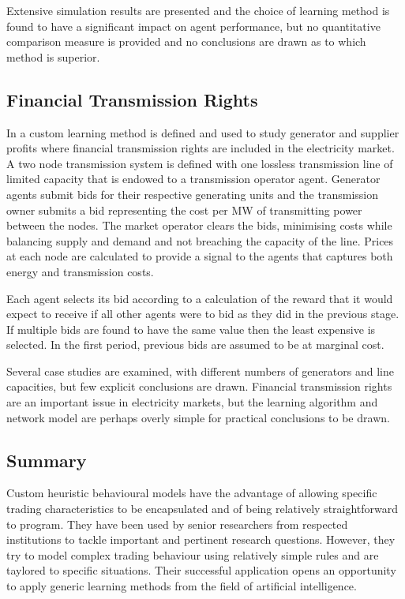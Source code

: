 Extensive simulation results are presented and the choice of learning method is
found to have a significant impact on agent performance, but no quantitative
comparison measure is provided and no conclusions are drawn as to which method
is superior.

\subsection{Financial Transmission Rights}
In  a custom learning method is defined and used to study
generator and supplier profits where financial transmission rights are included
in the electricity market.  A two node transmission system is defined with one
lossless transmission line of limited capacity that is endowed to a transmission
operator agent.  Generator agents submit bids for their respective generating
units and the transmission owner submits a bid representing the cost per MW of
transmitting power between the nodes.  The market operator clears the bids,
minimising costs while balancing supply and demand and not breaching the
capacity of the line.  Prices at each node are calculated to provide a signal to
the agents that captures both energy and transmission costs.


Each agent selects its bid according to a calculation of the reward that it
would expect to receive if all other agents were to bid as they did in the
previous stage.  If multiple bids are found to have the same value then the
least expensive is selected.  In the first period, previous bids are assumed to
be at marginal cost.

Several case studies are examined, with different numbers of generators and
line capacities, but few explicit conclusions are drawn.  Financial transmission
rights are an important issue in electricity markets, but the learning algorithm
and network model are perhaps overly simple for practical conclusions to be
drawn.

\subsection{Summary}
Custom heuristic behavioural models have the advantage of allowing specific
trading characteristics to be encapsulated and of being relatively
straightforward to program. They have been used by senior researchers from
respected institutions to tackle important and pertinent research
questions. However, they try to model complex trading behaviour using relatively
simple rules and are taylored to specific situations. Their successful
application opens an opportunity to apply generic learning methods from
the field of artificial intelligence.

